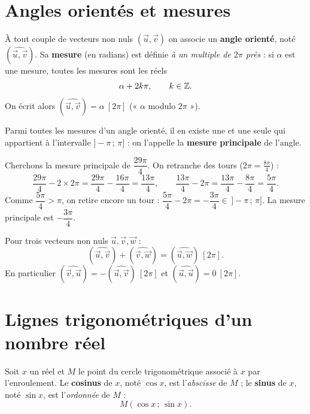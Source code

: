 \section{Angles orientés et mesures}

\begin{definition}
À tout couple de vecteurs non nuls $(\vec{u},\vec{v})$ on associe un \textbf{angle
orienté}, noté $(\widehat{\vec{u},\vec{v}})$. Sa \textbf{mesure} (en radians) est
définie \emph{à un multiple de $2\pi$ près} : si $\alpha$ est une mesure, toutes
les mesures sont les réels
\[ \alpha + 2k\pi, \qquad k\in\mathbb{Z}. \]
On écrit alors $(\widehat{\vec{u},\vec{v}})=\alpha\ [2\pi]$ (« $\alpha$ modulo
$2\pi$ »).
\end{definition}

\begin{definition}
Parmi toutes les mesures d'un angle orienté, il en existe une et une seule qui
appartient à l'intervalle $]-\pi\,;\,\pi]$ : on l'appelle la \textbf{mesure
principale} de l'angle.
\end{definition}

\begin{exemple}
Cherchons la mesure principale de $\dfrac{29\pi}{4}$. On retranche des tours
($2\pi=\tfrac{8\pi}{4}$) :
\[ \frac{29\pi}{4}-2\times 2\pi=\frac{29\pi}{4}-\frac{16\pi}{4}=\frac{13\pi}{4},
   \qquad \frac{13\pi}{4}-2\pi=\frac{13\pi}{4}-\frac{8\pi}{4}=\frac{5\pi}{4}. \]
Comme $\dfrac{5\pi}{4}>\pi$, on retire encore un tour :
$\dfrac{5\pi}{4}-2\pi=-\dfrac{3\pi}{4}\in\,]-\pi\,;\,\pi]$. La mesure principale est
$-\dfrac{3\pi}{4}$.
\end{exemple}

\begin{propriete}
Pour trois vecteurs non nuls $\vec{u},\vec{v},\vec{w}$ :
\[ (\widehat{\vec{u},\vec{v}})+(\widehat{\vec{v},\vec{w}})
   =(\widehat{\vec{u},\vec{w}})\ [2\pi]. \]
En particulier $(\widehat{\vec{v},\vec{u}})=-(\widehat{\vec{u},\vec{v}})\ [2\pi]$
et $(\widehat{\vec{u},\vec{u}})=0\ [2\pi]$.
\end{propriete}

\section{Lignes trigonométriques d'un nombre réel}

\begin{definition}
Soit $x$ un réel et $M$ le point du cercle trigonométrique associé à $x$ par
l'enroulement. Le \textbf{cosinus} de $x$, noté $\cos x$, est l'\emph{abscisse} de
$M$ ; le \textbf{sinus} de $x$, noté $\sin x$, est l'\emph{ordonnée} de $M$ :
\[ M(\cos x\,;\,\sin x). \]
\end{definition}

